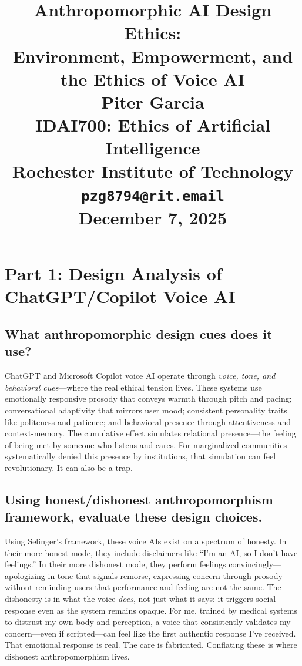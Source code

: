 \documentclass[12pt,twoside]{article}
\title{
\vspace*{1.5in}
\textbf{\Huge Anthropomorphic AI Design Ethics:}\\[0.5em]
\textbf{\Huge Environment, Empowerment, and the Ethics of Voice AI}\\[1.5em]

\vfill
\Huge \textbf{Piter Garcia}\\
\LARGE IDAI700: Ethics of Artificial Intelligence\\
Rochester Institute of Technology\\
\texttt{pzg8794@rit.email}\\

\vfill
\Huge \textbf{December 7, 2025}
}
\author{}
\date{}
\begin{document}
\thispagestyle{empty}
\maketitle
\newpage

\pagestyle{fancy}

\section*{Part 1: Design Analysis of ChatGPT/Copilot Voice AI}

\subsection*{What anthropomorphic design cues does it use?}

ChatGPT and Microsoft Copilot voice AI operate through \emph{voice, tone, and behavioral cues}—where the real ethical tension lives. These systems use emotionally responsive prosody that conveys warmth through pitch and pacing; conversational adaptivity that mirrors user mood; consistent personality traits like politeness and patience; and behavioral presence through attentiveness and context-memory. The cumulative effect simulates relational presence—the feeling of being met by someone who listens and cares. For marginalized communities systematically denied this presence by institutions, that simulation can feel revolutionary. It can also be a trap.

\subsection*{Using honest/dishonest anthropomorphism framework, evaluate these design choices.}

Using Selinger's framework, these voice AIs exist on a spectrum of honesty. In their more honest mode, they include disclaimers like \enquote{I'm an AI, so I don't have feelings.} In their more dishonest mode, they perform feelings convincingly—apologizing in tone that signals remorse, expressing concern through prosody—without reminding users that performance and feeling are not the same. The dishonesty is in what the voice \emph{does}, not just what it says: it triggers social response even as the system remains opaque. For me, trained by medical systems to distrust my own body and perception, a voice that consistently validates my concern—even if scripted—can feel like the first authentic response I've received. That emotional response is real. The care is fabricated. Conflating these is where dishonest anthropomorphism lives.
\end{document}
